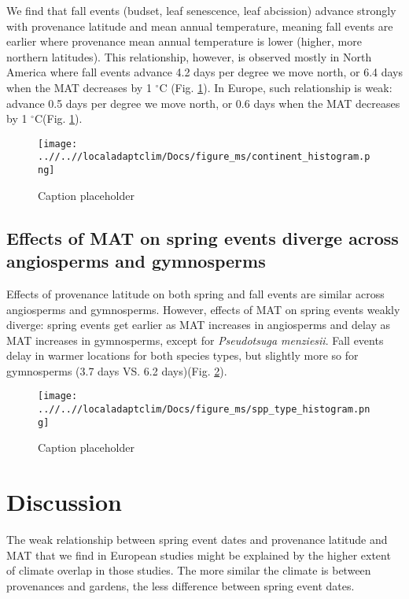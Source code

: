 \documentclass{article}
\begin{document}
We find that fall events (budset, leaf senescence, leaf abcission) advance strongly with provenance latitude and mean annual temperature, meaning fall events are earlier where provenance mean annual temperature is lower (higher, more northern latitudes). This relationship, however, is observed mostly in North America where fall events advance 4.2 days per degree we move north, or 6.4 days when the MAT decreases by 1 $^{\circ}$C (Fig. \ref{figure:continent}). In Europe, such relationship is weak: advance 0.5 days per degree we move north, or 0.6 days when the MAT decreases by 1 $^{\circ}$C(Fig. \ref{figure:continent}).

\begin{figure}[!h] 
    \centering
 \texttt{[image: ..//..//localadaptclim/Docs/figure\_ms/continent\_histogram.png]}
    \caption{Caption placeholder}
    \label{figure:continent}
\end{figure}


\subsection{Effects of MAT on spring events diverge across angiosperms and gymnosperms}

Effects of provenance latitude on both spring and fall events are similar across angiosperms and gymnosperms. However, effects of MAT on spring events weakly diverge: spring events get earlier as MAT increases in angiosperms and delay as MAT increases in gymnosperms, except for \emph{Pseudotsuga menziesii}. Fall events delay in warmer locations for both species types, but slightly more so for gymnosperms (3.7 days VS. 6.2 days)(Fig. \ref{figure:spp_type}).

\begin{figure}[!h] 
    \centering
 \texttt{[image: ..//..//localadaptclim/Docs/figure\_ms/spp\_type\_histogram.png]}
    \caption{Caption placeholder}
    \label{figure:spp_type}
\end{figure}


\section{Discussion}




The weak relationship between spring event dates and provenance latitude and MAT that we find in European studies might be explained by the higher extent of climate overlap in those studies. The more similar the climate is between provenances and gardens, the less difference between spring event dates.
\\
\end{document}

